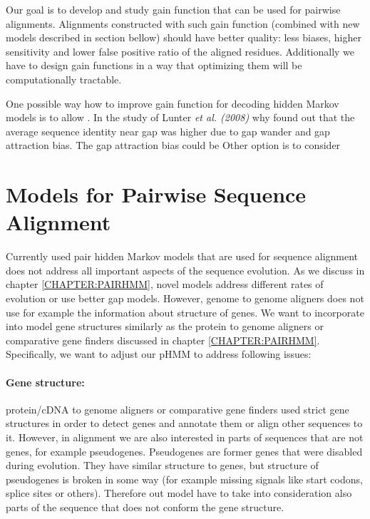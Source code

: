 Our goal is to develop and study gain function that can be used for pairwise
alignments. Alignments constructed with such gain function (combined with new
models described in section bellow) should have better quality: less biases,
higher sensitivity and lower false positive ratio of the aligned residues.
Additionally we have to design gain functions in a way that optimizing them will
be computationally tractable.

One possible way how to improve gain function for decoding hidden Markov models
is to allow  . In the study of Lunter {\it et al. (2008)} why found out that the
average sequence identity near gap was higher due to gap wander and gap
attraction bias. The gap attraction bias could be 
Other option is to consider 

\section{Models for Pairwise Sequence Alignment}

Currently used pair hidden Markov models that are used for sequence alignment
does not address all important aspects of the sequence evolution. As we discuss
in chapter \ref{CHAPTER:PAIRHMM}, novel models address different rates of
evolution or use better gap models. However, genome to genome aligners does not
use for example the information about structure of genes. We want to incorporate
into model gene structures similarly as the protein to genome aligners or
comparative gene finders discussed in chapter \ref{CHAPTER:PAIRHMM}.
Specifically, we want to adjust our pHMM to  address following issues: 

\paragraph{Gene structure:}  protein/cDNA to genome aligners or comparative gene
finders used strict gene structures in order to detect genes and annotate them
or align other sequences to it.  However, in alignment we are also interested in
parts of sequences that are not genes, for example pseudogenes. Pseudogenes are
former genes that were disabled during evolution. They have similar structure to
genes, but structure of pseudogenes is broken in some way (for example missing
signals like start codons, splice sites or others). Therefore out model have to
take into consideration also parts of the sequence that does not conform the
gene structure.


